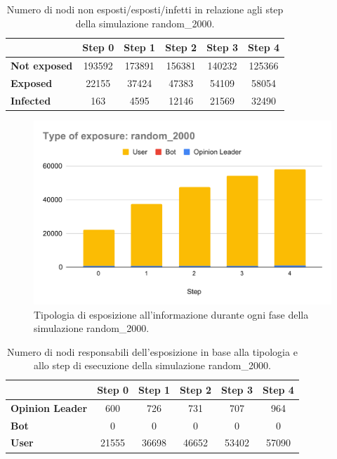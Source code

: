         \begin{table}[H]
            \centering
            \begin{tabular}{l|c|c|c|c|c}
                        & Step 0 & Step 1 & Step 2 & Step 3 & Step 4 \\ \hline
            \textbf{Not exposed} & 193592 & 173891 & 156381 & 140232 & 125366 \\ \hline
            \textbf{Exposed}     & 22155  & 37424  & 47383  & 54109  & 58054  \\ \hline
            \textbf{Infected}    & 163    & 4595   & 12146  & 21569  & 32490  \\
            \end{tabular}
            \caption{Numero di nodi non esposti/esposti/infetti in relazione agli step della simulazione random\_2000.}
        \end{table}
        
        \begin{figure}[H]
            \centering
            \includegraphics[width=.7\textwidth]{resources/charts/Type of exposure_ random_2000.pdf}
            \caption{Tipologia di esposizione all'informazione durante ogni fase della simulazione random\_2000.}
        \end{figure}
        
        \begin{table}[H]
            \centering
            \begin{tabular}{l|c|c|c|c|c}
                           & Step 0 & Step 1 & Step 2 & Step 3 & Step 4 \\ \hline
           \textbf{Opinion Leader} & 600    & 726    & 731    & 707    & 964    \\ \hline
            \textbf{Bot}            & 0      & 0      & 0      & 0      & 0      \\ \hline
            \textbf{User}           & 21555  & 36698  & 46652  & 53402  & 57090  \\
            \end{tabular}
            \caption{Numero di nodi responsabili dell'esposizione in base alla tipologia e allo step di esecuzione della simulazione random\_2000.}
        \end{table}
        

